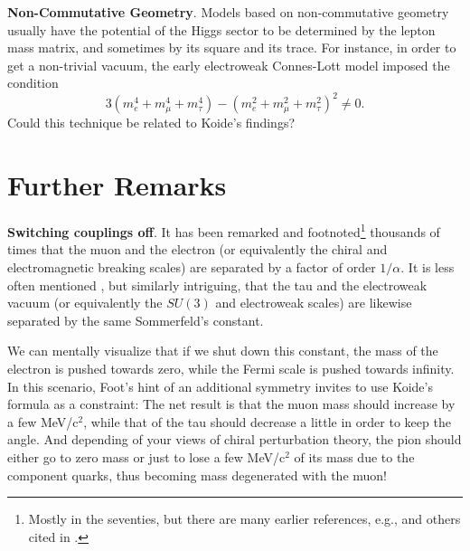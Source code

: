 \documentclass[12pt,a4paper]{article}
\begin{document}


{\bf Non-Commutative Geometry}. Models based on non-commutative geometry usually have the
potential of the Higgs sector to be determined by the lepton mass 
matrix, and sometimes by its square and its trace. For instance, in order to get a non-trivial vacuum, the early electroweak Connes-Lott model imposed the condition
%
\begin{equation}
 3 (m_e^4+m_\mu^4+m_\tau^4) -(m_e^2+m_\mu^2+m_\tau^2)^2 \neq 0 .
\end{equation}
%
Could this technique be related to Koide's findings?

\section*{Further Remarks}

{\bf Switching couplings off}. It has been remarked and footnoted\footnote{Mostly in the seventies, but there are many
earlier references, e.g., \cite{alfa2, alfa1} and others cited in \cite{gh2005}.} thousands
of times that the muon and the electron (or equivalently the chiral and
electromagnetic breaking scales) are separated by a factor of order
$1/\alpha$. It is less often mentioned \cite{y}, but similarly intriguing, that the
tau and the electroweak vacuum (or equivalently the $SU(3)$ and electroweak scales) are likewise separated by the same Sommerfeld's constant. 

We can mentally
visualize that if we shut down this constant, the mass of the electron
is pushed towards zero, while the Fermi scale is pushed towards infinity.
In this scenario, Foot's hint of an additional symmetry invites to use
Koide's formula as a constraint: The net result is that the muon
mass should increase by a few MeV/c$^2$, while that of the tau should decrease a little in order
to keep the angle. And depending of your views of chiral perturbation theory, the pion should either go to zero mass or just to lose a few MeV/c$^2$ of its mass due
to the component quarks, thus becoming mass degenerated with the
muon!  
\end{document}
